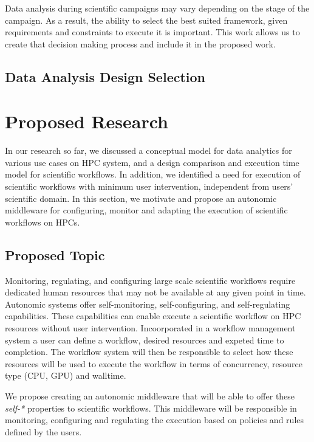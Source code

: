 {Data analysis during scientific campaigns may vary depending on the stage of the 
campaign. As a result, the ability to select the best suited framework, given 
requirements and constraints to execute it is important. This work allows us to 
create that decision making process and include it in the proposed work.

\subsection{Data Analysis Design Selection}


\section{Proposed Research}

In our research so far, we discussed a conceptual model for data analytics for 
various use cases on HPC system, and a design comparison and execution time model 
for scientific workflows. In addition, we identified a need for execution of 
scientific workflows with minimum user intervention, independent from users' 
scientific domain. In this section, we motivate and propose an autonomic middleware 
for configuring, monitor and adapting the execution of scientific workflows on 
HPCs.

\subsection{Proposed Topic}

Monitoring, regulating, and configuring large scale scientific workflows require 
dedicated human resources that may not be available at any given point in time. 
Autonomic systems offer self-monitoring, self-configuring, and self-regulating 
capabilities. These capabilities can enable execute a scientific 
workflow on HPC resources without user intervention. Incoorporated in a workflow management system a user can define a workflow, desired resources and expeted time to 
completion. The workflow system will then be responsible 
to select how these resources will be used to execute the workflow in terms of concurrency, 
resource type (CPU, GPU) and walltime.

We propose creating an autonomic middleware that will be able to offer these 
\textit{self-*} properties to scientific workflows. This middleware will be 
responsible in monitoring, configuring and regulating the execution based on 
policies and rules defined by the users. 

}
